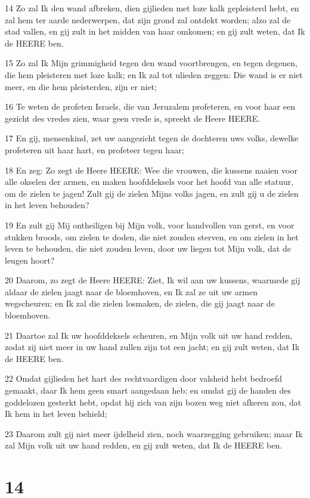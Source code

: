 \par 14 Zo zal Ik den wand afbreken, dien gijlieden met loze kalk gepleisterd hebt, en zal hem ter aarde nederwerpen, dat zijn grond zal ontdekt worden; alzo zal de stad vallen, en gij zult in het midden van haar omkomen; en gij zult weten, dat Ik de HEERE ben.
\par 15 Zo zal Ik Mijn grimmigheid tegen den wand voortbrengen, en tegen degenen, die hem pleisteren met loze kalk; en Ik zal tot ulieden zeggen: Die wand is er niet meer, en die hem pleisterden, zijn er niet;
\par 16 Te weten de profeten Israels, die van Jeruzalem profeteren, en voor haar een gezicht des vredes zien, waar geen vrede is, spreekt de Heere HEERE.
\par 17 En gij, mensenkind, zet uw aangezicht tegen de dochteren uws volks, dewelke profeteren uit haar hart, en profeteer tegen haar;
\par 18 En zeg: Zo zegt de Heere HEERE: Wee die vrouwen, die kussens naaien voor alle okselen der armen, en maken hoofddeksels voor het hoofd van alle statuur, om de zielen te jagen! Zult gij de zielen Mijns volks jagen, en zult gij u de zielen in het leven behouden?
\par 19 En zult gij Mij ontheiligen bij Mijn volk, voor handvollen van gerst, en voor stukken broods, om zielen te doden, die niet zouden sterven, en om zielen in het leven te behouden, die niet zouden leven, door uw liegen tot Mijn volk, dat de leugen hoort?
\par 20 Daarom, zo zegt de Heere HEERE: Ziet, Ik wil aan uw kussens, waarmede gij aldaar de zielen jaagt naar de bloemhoven, en Ik zal ze uit uw armen wegscheuren; en Ik zal die zielen losmaken, de zielen, die gij jaagt naar de bloemhoven.
\par 21 Daartoe zal Ik uw hoofddeksels scheuren, en Mijn volk uit uw hand redden, zodat zij niet meer in uw hand zullen zijn tot een jacht; en gij zult weten, dat Ik de HEERE ben.
\par 22 Omdat gijlieden het hart des rechtvaardigen door valsheid hebt bedroefd gemaakt, daar Ik hem geen smart aangedaan heb; en omdat gij de handen des goddelozen gesterkt hebt, opdat hij zich van zijn bozen weg niet afkeren zou, dat Ik hem in het leven behield;
\par 23 Daarom zult gij niet meer ijdelheid zien, noch waarzegging gebruiken; maar Ik zal Mijn volk uit uw hand redden, en gij zult weten, dat Ik de HEERE ben.

\chapter{14}

